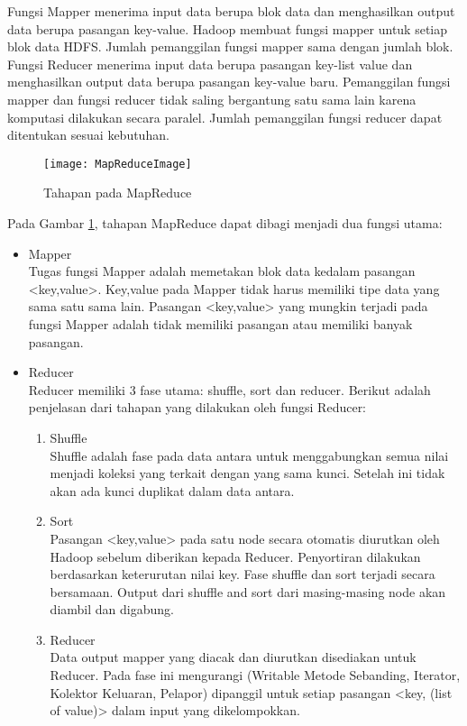 \newpage
\par Fungsi Mapper menerima input data berupa blok data dan menghasilkan output data berupa pasangan key-value. Hadoop membuat fungsi mapper untuk setiap blok data HDFS. Jumlah pemanggilan fungsi mapper sama dengan jumlah blok. Fungsi Reducer menerima input data berupa pasangan key-list value dan menghasilkan output data berupa pasangan key-value baru. Pemanggilan fungsi mapper dan fungsi reducer tidak saling bergantung satu sama lain karena komputasi dilakukan secara paralel. Jumlah pemanggilan fungsi reducer dapat ditentukan sesuai kebutuhan.

\begin{figure}[H]
	\centering
	\texttt{[image: MapReduceImage]}
	\caption{Tahapan pada MapReduce}
	\label{fig:MapReduceImage}
\end{figure}


Pada Gambar \ref{fig:MapReduceImage}, tahapan MapReduce dapat dibagi menjadi dua fungsi utama:
\begin{itemize}
\item Mapper\\
Tugas fungsi Mapper adalah memetakan blok data kedalam pasangan <key,value>. Key,value pada Mapper tidak harus memiliki tipe data yang sama satu sama lain. Pasangan <key,value> yang mungkin terjadi pada fungsi Mapper adalah tidak memiliki pasangan atau memiliki banyak pasangan.

\item Reducer\\
Reducer memiliki 3 fase utama: shuffle, sort dan reducer. Berikut adalah penjelasan dari tahapan yang dilakukan oleh fungsi Reducer:

\begin{enumerate}
\item Shuffle \\
Shuffle adalah fase pada data antara untuk menggabungkan semua nilai menjadi koleksi yang terkait dengan yang sama
kunci. Setelah ini tidak akan ada kunci duplikat dalam data antara.
\item Sort \\
Pasangan <key,value> pada satu node secara otomatis diurutkan oleh Hadoop sebelum diberikan kepada Reducer. Penyortiran dilakukan berdasarkan keterurutan nilai key. Fase shuffle dan sort terjadi secara bersamaan. Output dari shuffle and sort dari masing-masing node akan diambil dan digabung.	
\item Reducer \\
Data output mapper yang diacak dan diurutkan disediakan untuk Reducer. Pada fase ini mengurangi (Writable Metode Sebanding, Iterator, Kolektor Keluaran, Pelapor) dipanggil untuk setiap pasangan <key, (list of value)> dalam input yang dikelompokkan. 
\end{enumerate}

\end{itemize}

